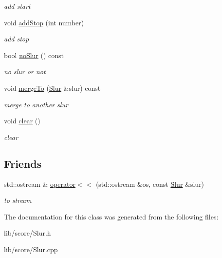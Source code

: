 \begin{DoxyCompactItemize}
\begin{DoxyCompactList}\small\item\em add start \end{DoxyCompactList}\item 
\hypertarget{classsinsy_1_1Slur_a98162ae58b2c8b6306b93dbae9f9a352}{void \hyperlink{classsinsy_1_1Slur_a98162ae58b2c8b6306b93dbae9f9a352}{add\-Stop} (int number)}\label{classsinsy_1_1Slur_a98162ae58b2c8b6306b93dbae9f9a352}

\begin{DoxyCompactList}\small\item\em add stop \end{DoxyCompactList}\item 
\hypertarget{classsinsy_1_1Slur_a46e79fde5bc86ea0cdc3a2fc9c4f6106}{bool \hyperlink{classsinsy_1_1Slur_a46e79fde5bc86ea0cdc3a2fc9c4f6106}{no\-Slur} () const }\label{classsinsy_1_1Slur_a46e79fde5bc86ea0cdc3a2fc9c4f6106}

\begin{DoxyCompactList}\small\item\em no slur or not \end{DoxyCompactList}\item 
\hypertarget{classsinsy_1_1Slur_a270b3b4a1ef3046778aa450f7c8fd6b2}{void \hyperlink{classsinsy_1_1Slur_a270b3b4a1ef3046778aa450f7c8fd6b2}{merge\-To} (\hyperlink{classsinsy_1_1Slur}{\-Slur} \&slur) const }\label{classsinsy_1_1Slur_a270b3b4a1ef3046778aa450f7c8fd6b2}

\begin{DoxyCompactList}\small\item\em merge to another slur \end{DoxyCompactList}\item 
\hypertarget{classsinsy_1_1Slur_a5e500b2c0b5edd2f507018e42fab26e7}{void \hyperlink{classsinsy_1_1Slur_a5e500b2c0b5edd2f507018e42fab26e7}{clear} ()}\label{classsinsy_1_1Slur_a5e500b2c0b5edd2f507018e42fab26e7}

\begin{DoxyCompactList}\small\item\em clear \end{DoxyCompactList}\end{DoxyCompactItemize}
\subsection*{\-Friends}
\begin{DoxyCompactItemize}
\item 
\hypertarget{classsinsy_1_1Slur_a8ff2ab21451a4b94bffe63cef60dce96}{std\-::ostream \& \hyperlink{classsinsy_1_1Slur_a8ff2ab21451a4b94bffe63cef60dce96}{operator$<$$<$} (std\-::ostream \&os, const \hyperlink{classsinsy_1_1Slur}{\-Slur} \&slur)}\label{classsinsy_1_1Slur_a8ff2ab21451a4b94bffe63cef60dce96}

\begin{DoxyCompactList}\small\item\em to stream \end{DoxyCompactList}\end{DoxyCompactItemize}


\-The documentation for this class was generated from the following files\-:\begin{DoxyCompactItemize}
\item 
lib/score/\-Slur.\-h\item 
lib/score/\-Slur.\-cpp\end{DoxyCompactItemize}
